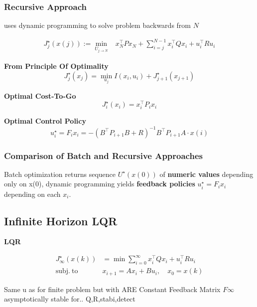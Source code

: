 \subsubsection{Recursive Approach}

uses dynamic programming to solve problem backwards from $N$

\[\begin{aligned}
		J_j^\star(x(j)) :=
		\min_{U_{j\to N}} & x_N^\top P x_N \!+
		\sum_{i=j}^{N-1}x_i^\top Q x_i + u_i^\top R u_i
	\end{aligned}\]


\begin{minipage}[t]{0.64\linewidth}
	\textbf{From Principle Of Optimality}
	\[
		J_j^\star(x_j) =
		\min_{u_j} I(x_i,u_i) + J_{j+1}^\star(x_{j+1})
	\]
\end{minipage}
\begin{minipage}[t]{0.32\linewidth}
	\textbf{Optimal Cost-To-Go}
	\[
		J_i^\star(x_i) = x_i^\top P_i x_i
	\]
\end{minipage}

\textbf{Optimal Control Policy}
\[
	u_i^\star = F_i x_i =
	-(B^\top P_{i+1}B + R)^{-1}
	B^\top P_{i+1} A \cdot x(i)
\]

\subsubsection{Comparison of Batch and Recursive Approaches}

Batch optimization returns sequence $U^\star(x(0))$
of \textbf{numeric values} depending only on x(0),
dynamic programming yields \textbf{feedback policies}
$u_i^\star = F_i x_i$ depending on each $x_i$.

\subsection{Infinite Horizon LQR}
\begin{sstTitleBox}[ForestGreen]{\center\textbf{\large
			LQR
		}
	}

	\[ \begin{aligned}
			J_\infty^\star(x(k))  & = \min \sum_{i=0}^\infty
			x_i^\top Q x_i + u_i^\top R u_i                                   \\
			\mathrm{subj.\ to }\  & x_{i+1} = Ax_i + Bu_i,\quad    x_0 = x(k)
		\end{aligned} \]

	Same u as for finite problem but with ARE
	Constant  Feedback Matrix $F\infty$
	asymptotically stable for.. Q,R,stabi,detect


\end{sstTitleBox}

